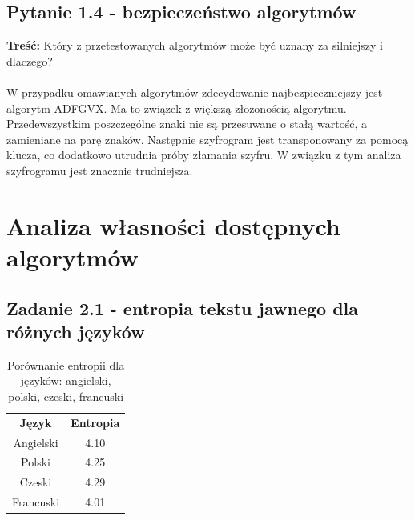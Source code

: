 \documentclass{article}
\begin{document}
\subsection*{Pytanie 1.4 - bezpieczeństwo algorytmów}
\textbf{Treść:}
Który z przetestowanych algorytmów może być uznany za silniejszy i dlaczego?\\\\
W przypadku omawianych algorytmów zdecydowanie najbezpieczniejszy jest algorytm ADFGVX.
Ma to związek z większą złożonością algorytmu. Przedewszystkim poszczególne znaki nie są przesuwane o stałą wartość, a zamieniane na parę znaków.
Następnie szyfrogram jest transponowany za pomocą klucza, co dodatkowo utrudnia próby złamania szyfru. W związku z tym analiza szyfrogramu jest znacznie trudniejsza.


\section{Analiza własności dostępnych algorytmów}

\subsection*{Zadanie 2.1 - entropia tekstu jawnego dla różnych języków}
\begin{table}[H]
    \centering
    \begin{tabular}{|c|c|}
        \cline{1-2}
        \textbf{Język} & \textbf{Entropia}  \\ \cline{1-2}
        Angielski      & 4.10               \\ \cline{1-2}
        Polski         & 4.25               \\ \cline{1-2}
        Czeski         & 4.29               \\ \cline{1-2}
        Francuski      & 4.01               \\ \cline{1-2}
    \end{tabular}
    \caption{Porównanie entropii dla języków: angielski, polski, czeski, francuski}
\end{table}
\end{document}
